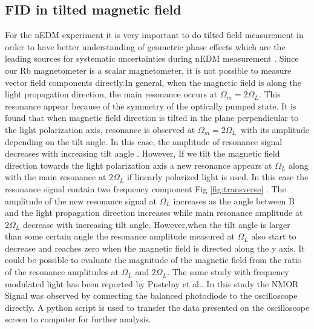 \subsection{FID in tilted magnetic field}
For the nEDM experiment it is very important to do tilted field measurement in order to have better understanding of  geometric phase effects which are the leading sources for systematic uncertainties during nEDM measurement . 
Since our Rb magnetometer is a scalar magnetometer, it is not possible to measure vector field components directly.In general, when the magnetic field is along the light propagation direction, the main resonance occurs at $\Omega_m = 2\Omega_L$. This resonance appear because of the symmetry of the optically pumped state. It is found that when magnetic field direction is tilted in the plane perpendicular to the light polarization axis, resonance is observed at  $\Omega_m = 2\Omega_L$~with its amplitude depending on the tilt angle. In this case, the amplitude of resonance signal decreases with increasing tilt angle . However, If we tilt the magnetic field direction towards the light polarization axis a new resonance appears at $\Omega_L$ along with the main resonance at $2\Omega_L$ if linearly polarized light is used. In this case the resonance signal contain two frequency component Fig \ref{fig:transverse} . The amplitude of the new resonance signal at $\Omega_L$  increases as the angle between B and the light propagation direction increases while main resonance amplitude at $2\Omega_L$  decrease with increasing tilt angle. However,when the tilt angle is larger than some certain angle the resonance amplitude measured at $\Omega_L$ also start to decrease and reaches zero when the magnetic field is directed along the y axis.   It could be possible to evaluate the magnitude of the magnetic field from the ratio of the resonance amplitudes at $\Omega_L$ and $2\Omega_L$. The same study with frequency modulated light has been reported by Pustelny et al.\cite{PhysRevA.74.063420}. In this study the NMOR Signal was observed by connecting the balanced photodiode to the oscilloscope directly. A python script is used to transfer the data presented on the oscilloscope screen to computer for further analysis. 

